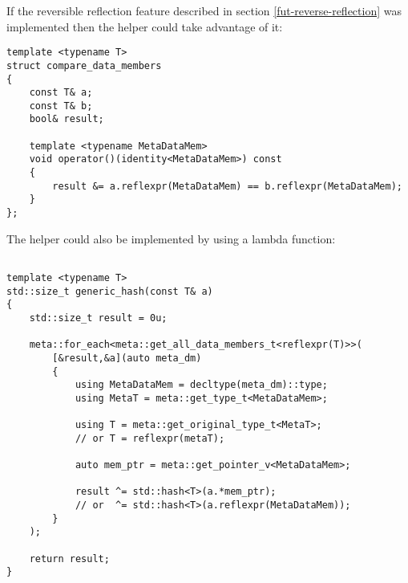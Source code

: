 If the reversible reflection feature described in section \ref{fut-reverse-reflection}
was implemented then the helper could take advantage of it:

\begin{verbatim}
template <typename T>
struct compare_data_members
{
	const T& a;
	const T& b;
	bool& result;

	template <typename MetaDataMem>
	void operator()(identity<MetaDataMem>) const
	{
		result &= a.reflexpr(MetaDataMem) == b.reflexpr(MetaDataMem);
	}
};
\end{verbatim}

The helper could also be implemented by using a lambda function:

\begin{verbatim}

template <typename T>
std::size_t generic_hash(const T& a)
{
	std::size_t result = 0u;

	meta::for_each<meta::get_all_data_members_t<reflexpr(T)>>(
		[&result,&a](auto meta_dm)
		{
			using MetaDataMem = decltype(meta_dm)::type;
			using MetaT = meta::get_type_t<MetaDataMem>;

			using T = meta::get_original_type_t<MetaT>;
			// or T = reflexpr(metaT);

			auto mem_ptr = meta::get_pointer_v<MetaDataMem>;

			result ^= std::hash<T>(a.*mem_ptr);
			// or  ^= std::hash<T>(a.reflexpr(MetaDataMem));
		}
	);

	return result;
}
\end{verbatim}

